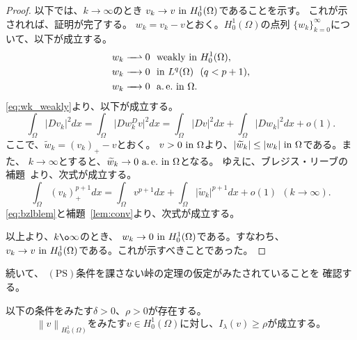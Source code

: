 \begin{proof}
 以下では、$k \to \infty$のとき
 $v_k \to v ~\text{in}~ H_0^1(\Omega)$であることを示す。
 これが示されれば、証明が完了する。
 $w_k = v_k - v$とおく。$H_0^1(\Omega)$の点列
 $\{ w_k \}_{k=0}^\infty$について、以下が成立する。
 \begin{align}
  w_k \xrightharpoonup{ \mbox{ ~ } } 0 & \ \ \text{weakly~} \tin
  H_0^1(\Omega), \label{eq:wk_weakly} \\
  w_k \xrightarrow{ \mbox{ ~ } } 0 & \ \ \tin L^q(\Omega) \ \
  (q < p+1), \label{eq:wk_Lq} \\
  w_k \xrightarrow{ \mbox{ ~ } } 0 & \ \ \ae \tin \Omega. 
  \label{eq:wk_ae}
 \end{align}
 \eqref{eq:wk_weakly}より、以下が成立する。
 \[
  \int_\Omega \lvert D v_k \rvert^2 dx = \int_\Omega \lvert Dw_k ^ Dv
 \rvert^2 dx = \int_\Omega \lvert Dv \rvert^2 dx + \int_\Omega \lvert
 Dw_k \rvert^2 dx + o(1).
 \]
 ここで、$\tilde{w}_k = (v_k)_+ - v$とおく。
 $v > 0 ~\text{in}~ \Omega$より、$\lvert \widetilde{w}_k \rvert \leq \lvert w_k
 \rvert ~\text{in}~ \Omega$である。また、
 $k \to \infty$とすると、$\widetilde{w}_k \to 0 ~\text{a.\,e.}~ \text{in}~ \Omega$となる。
 ゆえに、ブレジス・リーブの補題~\cite{MR699419}より、次式が成立する。
 \begin{equation}
  \int_\Omega (v_k)_{+}^{p+1} dx = \int_\Omega v^{p+1} dx +
   \int_\Omega \lvert \tilde{w}_k \rvert^{p+1} dx + o(1) \ \ (k \to
   \infty).
   \label{eq:bzlblem}
 \end{equation}
 \eqref{eq:bzlblem}と補題~\ref{lem:conv}より、次式が成立する。
 
 以上より、$k \o \infty$のとき、
 $w_k \to 0 ~\text{in}~ H_0^1(\Omega)$である。すなわち、
 $v_k \to v ~\text{in}~ H_0^1(\Omega)$である。これが示すべきことであった。\qedhere
\end{proof}

続いて、
$(\mathrm{PS})$条件を課さない峠の定理の仮定がみたされていることを
確認する。

\begin{lem} \label{lem:delta_rho}
 以下の条件をみたす$\delta > 0$、$\rho > 0$が存在する。
 \begin{equation}
  \text{$\left\|v \right\|_{H^1_0(\Omega)}$をみたす$v \in
   H_0^1(\Omega)$に対し、$I_\lambda(v) \geq \rho$が成立する。} 
   \label{eq:delta_rho}
 \end{equation}
\end{lem}

